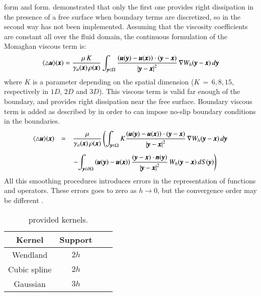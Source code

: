 \citet{Monaghan+Gingold:83} form and \citet{Morris+etal:1997} form. \citet{Colagrossi2009} demonstrated that
only the first one provides right dissipation in the presence of a free surface when boundary terms are
discretized, so in \NAME the second way has not been implemented.\rc
%
Assuming that the viscosity coefficients are constant all over the fluid domain, the continuous
formulation of the Monaghan viscous term is:
%
\begin{eqnarray}
\langle \bigtriangleup \pmb{u} \rangle (\pmb{x}) = 
\frac{\mu \, K}{\gamma_a(\pmb{x}) \, \rho(\pmb{x})} \int_{\pmb{y} \in \Omega}
	\frac{
		\left(\pmb{u}(\pmb{y}) - \pmb{u}(\pmb{x}) \right) \cdot (\pmb{y} - \pmb{x})
	}{
		\left\vert \pmb{y} - \pmb{x} \right\vert^2
	} \, \nabla  W_h(\pmb{y} - \pmb{x}) \, d\pmb{y}
\end{eqnarray}
%
where $K$ is a parameter depending on the spatial dimension ($K\,=\,6,8,15$, respectively in $1D$,
$2D$ and $3D$).\rc
%
This viscous term is valid far enough of the boundary, and provides right dissipation near the free surface.
Boundary viscous term is added as described by \citet{Maciaetal_PTP_2012} in order to can impose no-slip
boundary conditions in the boundaries.
%
\begin{eqnarray}
\begin{array}{lcl}
\langle \laplacian \bs u \rangle (\bs x) & = &
\dsty{\frac{\mu}{\gamma_a(\bs x) \, \rho(\bs x)}} \left(
	\SPHint K \frac{
		\left(\bs{u}(\bs y) - \bs{u}(\bs x) \right) \cdot (\bs{y} - \bs{x})
	}{
		\left\vert \bs{y} - \bs{x} \right\vert^2
	} \, \gradient  W_h(\bs y - \bs x) \, d\bs{y} \right.
	\vspace{0.3cm} \\ & & 	
    \left. - \dsty{\SPHboundint \left(\bs{u}(\bs y) - \bs{u}(\bs x) \right) \frac{
		 (\bs{y} - \bs{x}) \cdot \bs{n}(\bs{y})
	}{
		\left\vert \bs{y} - \bs{x} \right\vert^2
	} \, W_h(\bs y - \bs x) \, dS(\bs{y})}
    \right)
\end{array}
\end{eqnarray}
%
All this smoothing procedures introduces errors in the representation of functions and operators. These errors
goes to zero as $h \rightarrow 0$, but the convergence order may be different
\citep{MaciaetalPTP,Maciaetal_PTP_2012}.
%
\begin{table}[h!b!p!]\small
	\centering
	\begin{tabular}{| c | c | c | l | }
		\hline
		\cellcolor[rgb]{0.7,0.7,0.7}Kernel & \cellcolor[rgb]{0.7,0.7,0.7}Support \\
		\hline
		Wendland     & $2h$ \\
		\hline
		Cubic spline & $2h$ \\
		\hline
		Gaussian     & $3h$ \\
		\hline
	\end{tabular}
	\caption{\NAME provided kernels.}
	\label{tables:abstract:kernels}
\end{table}
%
